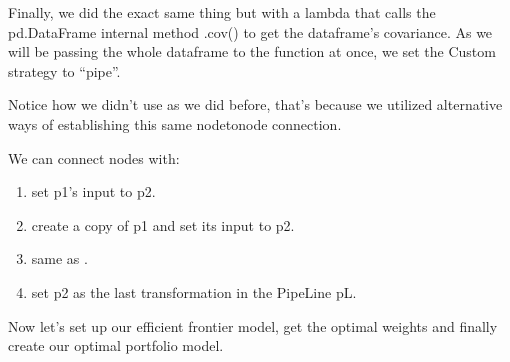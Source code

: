 \documentclass[letterpaper,10pt,english]{sphinxmanual}
\begin{document}
Finally, we did the exact same thing but with a lambda that calls the pd.DataFrame internal method .cov() to get the dataframe’s covariance. As we will be passing the whole dataframe to the function at once, we set the Custom strategy to “pipe”.

Notice how we didn’t use  as we did before, that’s because we utilized alternative ways of establishing this same node\sphinxhyphen{}to\sphinxhyphen{}node connection.

We can connect nodes with:
\begin{enumerate}
%
\item {} 
 set p1’s input to p2.

\item {} 
 create a copy of p1 and set its input to p2.

\item {} 
 same as .

\item {} 
 set p2 as the last transformation in the PipeLine pL.

\end{enumerate}

Now let’s set up our efficient frontier model, get the optimal weights and finally create our optimal portfolio model.
\end{document}
